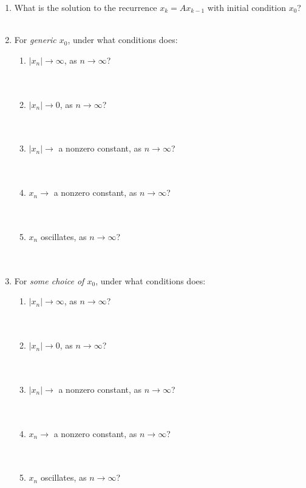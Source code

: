 \documentclass[11pt]{article}
\begin{document}
\begin{enumerate}
\item What is the solution to the recurrence $x_{k} = A x_{k-1}$ with initial condition $x_0$? \\ \\

\item For \emph{generic $x_0$}, under what conditions does:
\begin{enumerate}
\item $|x_n| \to \infty$, as $n \to \infty$? \\ \\ \\
\item $|x_n| \to 0$, as $n \to \infty$? \\ \\ \\
\item $|x_n| \to$ a nonzero constant, as $n \to \infty$? \\ \\ \\
\item $x_n \to$ a nonzero constant, as $n \to \infty$? \\ \\ \\
\item $x_n$ oscillates, as $n \to \infty$? \\ \\ \\
\end{enumerate}

\item For \emph{some choice of $x_0$}, under what conditions does:
\begin{enumerate}
\item $|x_n| \to \infty$, as $n \to \infty$? \\ \\ \\
\item $|x_n| \to 0$, as $n \to \infty$? \\ \\ \\
\item $|x_n| \to$ a nonzero constant, as $n \to \infty$? \\ \\ \\
\item $x_n \to$ a nonzero constant, as $n \to \infty$? \\ \\ \\
\item $x_n$ oscillates, as $n \to \infty$? \\ \\ \\
\end{enumerate}

\end{enumerate}
\end{document}
